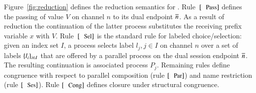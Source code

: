\noi Figure~\ref{fig:reduction} defines
the reduction semantics for \HOp.
Rule~$\orule{Pass}$ defines the passing
of value $V$ on channel $n$ to its dual endpoint $\overline{n}$.
As a result of reduction the continuation of the 
latter process substitutes the receiving prefix variable $x$
with $V$.
Rule~$\orule{Sel}$ is the standard rule for labeled choice/selection:
given an index set $I$, 
a process selects label $l_j, j \in I$ on channel $n$ over a set of
labels $\{l_i\}_{i \in I}$ that are offered by a parallel process
on the dual session endpoint $\overline{n}$.
The resulting continuation is associated process $P_j$.
Remaining rules define congruence 
with respect to parallel composition (rule $\orule{Par}$)
and name restriction (rule $\orule{Ses}$).
Rule $\orule{Cong}$ defines closure under structural congruence.




